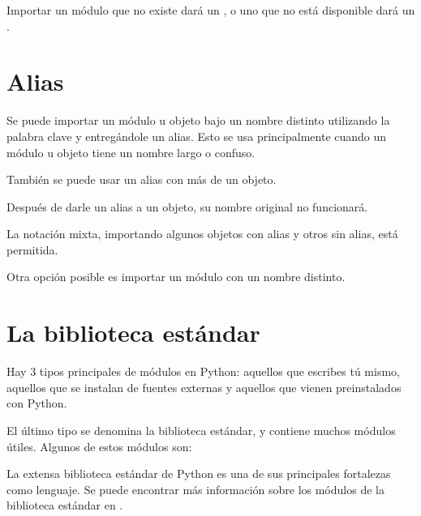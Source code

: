 Importar un módulo que no existe dará un , o uno que no está disponible dará un .


\section{Alias}

Se puede importar un módulo u objeto bajo un nombre distinto utilizando la palabra clave  y entregándole un alias.
Esto se usa principalmente cuando un módulo u objeto tiene un nombre largo o confuso.


También se puede usar un alias con más de un objeto.


Después de darle un alias a un objeto, su nombre original no funcionará.


La notación mixta, importando algunos objetos con alias y otros sin alias, está permitida.


Otra opción posible es importar un módulo con un nombre distinto.


\section{La biblioteca estándar}

Hay 3 tipos principales de módulos en Python: aquellos que escribes tú mismo, aquellos que se instalan de fuentes externas y aquellos que vienen preinstalados con Python.

El último tipo se denomina la biblioteca estándar, y contiene muchos módulos útiles.
Algunos de estos módulos son:


La extensa biblioteca estándar de Python es una de sus principales fortalezas como lenguaje.
Se puede encontrar más información sobre los módulos de la biblioteca estándar en .

